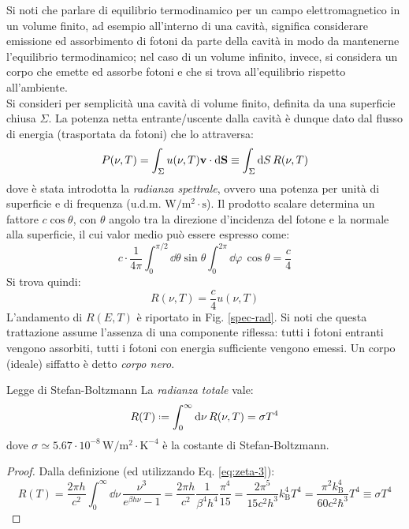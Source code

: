 Si noti che parlare di equilibrio termodinamico per un campo elettromagnetico in un volume finito, ad esempio all'interno di una cavità, significa considerare emissione ed assorbimento di fotoni da parte della cavità in modo da mantenerne l'equilibrio termodinamico; nel caso di un volume infinito, invece, si considera un corpo che emette ed assorbe fotoni e che si trova all'equilibrio rispetto all'ambiente. \\
Si consideri per semplicità una cavità di volume finito, definita da una superficie chiusa $ \Sigma $. La potenza netta entrante/uscente dalla cavità è dunque dato dal flusso di energia (trasportata da fotoni) che lo attraversa:
\begin{equation*}
	P(\nu,T) = \int_\Sigma u(\nu,T) \mathbf{v} \cdot \mathrm{d} \mathbf{S} \equiv \int_\Sigma \mathrm{d} S\, R(\nu,T)
\end{equation*}
dove è stata introdotta la \textit{radianza spettrale}, ovvero una potenza per unità di superficie e di frequenza (u.d.m. $ \text{W}/\text{m}^2 \cdot \text{s} $). Il prodotto scalare determina un fattore $ c \cos \theta $, con $ \theta $ angolo tra la direzione d'incidenza del fotone e la normale alla superficie, il cui valor medio può essere espresso come:
\begin{equation*}
	c \cdot \frac{1}{4\pi} \int_0^{\pi/2} \dd \theta \sin \theta \int_0^{2\pi} \dd \varphi\, \cos \theta = \frac{c}{4}
\end{equation*}
Si trova quindi:
\begin{equation}
	R(\nu,T) = \frac{c}{4} u(\nu,T)
\end{equation}
L'andamento di $ R(E,T) $ è riportato in Fig. \ref{spec-rad}.
Si noti che questa trattazione assume l'assenza di una componente riflessa: tutti i fotoni entranti vengono assorbiti, tutti i fotoni con energia sufficiente vengono emessi. Un corpo (ideale) siffatto è detto \textit{corpo nero}.

\begin{theorem}{Legge di Stefan-Boltzmann}{}
	La \textit{radianza totale} vale:
	\begin{equation}
		R(T) \defeq \int_0^\infty \dd \nu\, R(\nu,T) = \sigma T^4
	\end{equation}
	dove $ \sigma \simeq 5.67 \cdot 10^{-8} \,\text{W}/\text{m}^2 \cdot \text{K}^{-4} $ è la costante di Stefan-Boltzmann.

	\tcblower

	\begin{proof}
		Dalla definizione (ed utilizzando Eq. \ref{eq:zeta-3}):
		\begin{equation*}
			R(T) = \frac{2\pi h}{c^2} \int_0^\infty \dd \nu\, \frac{\nu^3}{e^{\beta h \nu} - 1} = \frac{2\pi h}{c^2} \frac{1}{\beta^4 h^4} \frac{\pi^4}{15} = \frac{2\pi^5}{15 c^2 h^3} k_\text{B}^4 T^4 = \frac{\pi^2 k_\text{B}^4}{60 c^2 \hbar^3} T^4 \equiv \sigma T^4
		\end{equation*}
	\end{proof}
\end{theorem}


